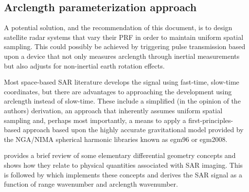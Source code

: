 \subsection{Arclength parameterization approach}
A potential solution, and the recommendation of this document, is to design satellite radar systems that vary their PRF in order to maintain uniform spatial sampling. This could possibly be achieved by triggering pulse transmission based upon a device that not only measures arclength through inertial measurements but also adjusts for non-inertial earth rotation effects.
\par 
Most space-based SAR literature develops the signal using fast-time, slow-time coordinates, but there are advantages to approaching the development using arclength instead of slow-time. These include a simplified (in the opinion of the authors) derivation, an approach that inherently assumes uniform spatial sampling and, perhaps most importantly, a means to apply a first-principles-based approach based upon the highly accurate gravitational model provided by the NGA/NIMA spherical harmonic libraries known as egm96 or egm2008.
\par
{} provides a brief review of some elementary differential geometry concepts and shows how they relate to physical quantities associated with SAR imaging. This is followed by  which implements these concepts and derives the SAR signal as a function of range wavenumber and arclength wavenumber.
\clearpage
